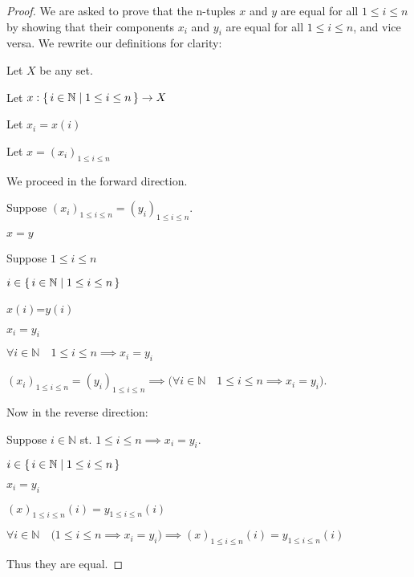 \documentclass[../../main.tex]{subfiles}
\begin{document}
\begin{proof}
    We are asked to prove that the n-tuples $x$ and $y$ are equal for all $1 \leq i \leq n$ by showing that their components $x_i$ and $y_i$ are equal for all  $1 \leq i \leq n$, and vice versa. We rewrite our definitions for clarity:
    \begin{lxl}
        \item Let $X$ be any set. 
        \item Let $x : \{\,i \in \mathbb{N}\mid1 \leq i \leq n\,\} \to X$
        \item Let $x_i = x(i)$ 
        \item Let $x = (x_i)_{1 \leq i \leq n}$
    \end{lxl}
    We proceed in the forward direction.
    \begin{lxl}[resume]
        \item Suppose $(x_i)_{1 \leq i \leq n} = (y_i)_{1 \leq i \leq n}$.
        \begin{lxl}
            \item $x = y$ 
            \item Suppose ${1 \leq i \leq n}$
            \begin{lxl}
                \item $i \in \{\,i \in \mathbb{N}\mid1 \leq i \leq n\,\}$
                \item $x(i)$=$y(i)$ 
                \item $x_i=y_i$ 
            \end{lxl}
            \item $\forall i \in \mathbb{N} \quad {1 {\leq} i {\leq} n} \implies x_i=y_i$
        \end{lxl}
        \item $(x_i)_{1 \leq i \leq n} = (y_i)_{1 \leq i \leq n} \implies \bigl( \forall i \in \mathbb{N} \quad {1 {\leq} i {\leq} n} \implies x_i=y_i \bigr)$.
    \end{lxl}
    Now in the reverse direction:
    \begin{lxl}[resume]
        \item Suppose $i \in \mathbb{N}$ st. ${1 {\leq} i {\leq} n} \implies x_i=y_i$.
        \begin{lxl}
            \item $i \in \{\,i \in \mathbb{N}\mid1 \leq i \leq n\,\}$ 
            \item $x_i=y_i$ 
            \item $(x)_{1 \leq i \leq n}(i)=y_{1 \leq i \leq n}(i)$ 
        \end{lxl}
        \item $\forall i \in \mathbb{N} \quad \bigl({1 {\leq} i {\leq} n} \implies x_i=y_i \bigr) \implies (x)_{1 \leq i \leq n}(i)=y_{1 \leq i \leq n}(i)$ 
    \end{lxl}\item
    Thus they are equal.
\end{proof}
\begin{xx}

\end{xx}
\end{document}
